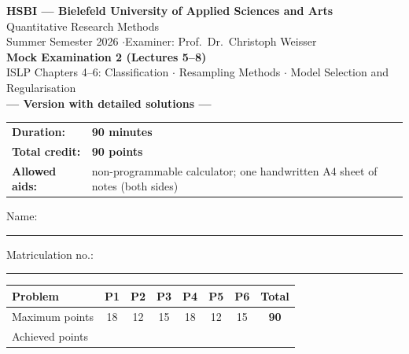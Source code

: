 \documentclass[11pt,a4paper]{article}
\begin{document}
\begin{center}
  {\Large\textbf{HSBI --- Bielefeld University of Applied Sciences and Arts}}\\[1.2mm]
  {\large Quantitative Research Methods}\\[1mm]
  {\normalsize Summer Semester 2026 \quad$\cdot$\quad Examiner: Prof.\ Dr.\ Christoph Weisser}\\[4.5mm]
  {\LARGE\textbf{Mock Examination 2 (Lectures 5--8)}}\\[1.2mm]
  {\normalsize ISLP Chapters 4--6: Classification $\cdot$ Resampling Methods $\cdot$ Model Selection and Regularisation}%
  \ifdefined\withsolutions\\[2.2mm]{\large\textcolor{teal!55!black}{\textbf{--- Version with detailed solutions ---}}}\fi
\end{center}

\vspace{2.5mm}
\begin{center}
\begin{tabular}{@{}ll@{}}
  \textbf{Duration:} & \textbf{90 minutes}\\
  \textbf{Total credit:} & \textbf{90 points}\\
  \textbf{Allowed aids:} & non-programmable calculator; one handwritten A4 sheet of notes (both sides)\\
\end{tabular}
\end{center}

\vspace{3mm}
Name: \rule[-1mm]{0.38\textwidth}{0.4pt}\hfill Matriculation no.: \rule[-1mm]{0.24\textwidth}{0.4pt}

\vspace{4.5mm}
\begin{center}
\renewcommand{\arraystretch}{1.35}
\begin{tabular}{|l|c|c|c|c|c|c|c|}
\hline
\textbf{Problem} & \textbf{P1} & \textbf{P2} & \textbf{P3} & \textbf{P4} & \textbf{P5} & \textbf{P6} & \textbf{Total}\\\hline
Maximum points & 18 & 12 & 15 & 18 & 12 & 15 & \textbf{90}\\\hline
Achieved points & \hspace{9mm} & \hspace{9mm} & \hspace{9mm} & \hspace{9mm} & \hspace{9mm} & \hspace{9mm} & \hspace{11mm}\\\hline
\end{tabular}
\end{center}
\end{document}
